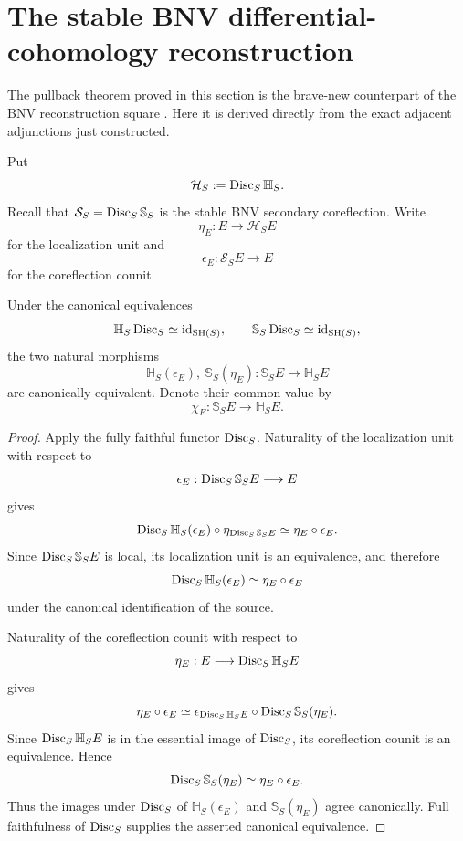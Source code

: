 \section{The stable BNV differential-cohomology reconstruction}
The pullback theorem proved in this section is the brave-new counterpart of
the BNV reconstruction square
\cite[Proposition~3.5]{BunkeNikolausVoelkl}.  Here it is derived directly
from the exact adjacent adjunctions just constructed.
\label{sec:infinitesimal-bnv-reconstruction}

Put
\[
    \mathcal H_S:=\operatorname{Disc}_S\mathbb H_S.
\]
Recall that $\mathcal S_S=\operatorname{Disc}_S\mathbb S_S$ is the stable BNV secondary
coreflection.
Write
\[
    \eta_E:E\longrightarrow\mathcal H_SE
\]
for the localization unit and
\[
    \epsilon_E:\mathcal S_SE\longrightarrow E
\]
for the coreflection counit.

\begin{lemma}
\label{lem:infinitesimal-bnv-adjacent-mates}
Under the canonical equivalences
\[
    \mathbb H_S\operatorname{Disc}_S\simeq\operatorname{id}_{\mathrm{SH}(S)},
    \qquad
    \mathbb S_S\operatorname{Disc}_S\simeq\operatorname{id}_{\mathrm{SH}(S)},
\]
the two natural morphisms
\[
    \mathbb H_S(\epsilon_E),\
    \mathbb S_S(\eta_E):
    \mathbb S_SE\longrightarrow\mathbb H_SE
\]
are canonically equivalent.  Denote their common value by
\[
    \chi_E:\mathbb S_SE\longrightarrow\mathbb H_SE.
\]
\end{lemma}

\begin{proof}
Apply the fully faithful functor $\operatorname{Disc}_S$.  Naturality of the localization
unit with respect to
\[
    \epsilon_E:\operatorname{Disc}_S\mathbb S_SE\longrightarrow E
\]
gives
\[
    \operatorname{Disc}_S\mathbb H_S(\epsilon_E)\circ
    \eta_{\operatorname{Disc}_S\mathbb S_SE}
    \simeq
    \eta_E\circ\epsilon_E.
\]
Since $\operatorname{Disc}_S\mathbb S_SE$ is local, its localization unit is an
equivalence, and therefore
\[
    \operatorname{Disc}_S\mathbb H_S(\epsilon_E)
    \simeq
    \eta_E\circ\epsilon_E
\]
under the canonical identification of the source.

Naturality of the coreflection counit with respect to
\[
    \eta_E:E\longrightarrow\operatorname{Disc}_S\mathbb H_SE
\]
gives
\[
    \eta_E\circ\epsilon_E
    \simeq
    \epsilon_{\operatorname{Disc}_S\mathbb H_SE}
    \circ
    \operatorname{Disc}_S\mathbb S_S(\eta_E).
\]
Since $\operatorname{Disc}_S\mathbb H_SE$ is in the essential image of $\operatorname{Disc}_S$, its
coreflection counit is an equivalence.  Hence
\[
    \operatorname{Disc}_S\mathbb S_S(\eta_E)
    \simeq
    \eta_E\circ\epsilon_E.
\]
Thus the images under $\operatorname{Disc}_S$ of
$\mathbb H_S(\epsilon_E)$ and $\mathbb S_S(\eta_E)$ agree canonically.
Full faithfulness of $\operatorname{Disc}_S$ supplies the asserted canonical equivalence.
\end{proof}

